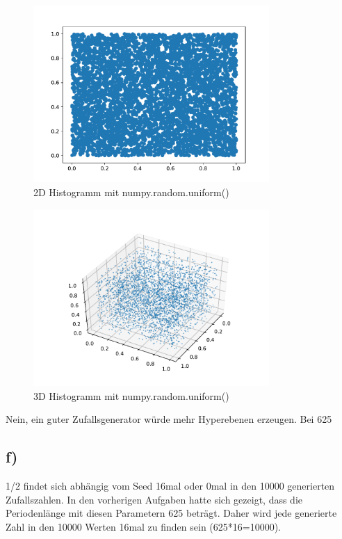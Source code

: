 \begin{figure}[H]
  \centering
  \includegraphics[width=0.8\textwidth]{nr8_d_npuni_2D_seed=0.2.pdf}
  \caption{2D Histogramm mit numpy.random.uniform()}
\end{figure}

\begin{figure}[H]
  \centering
  \includegraphics[width=0.8\textwidth]{nr8_d_npuni_3D_seed=0.2.pdf}
  \caption{3D Histogramm mit numpy.random.uniform()}
\end{figure}


Nein, ein guter Zufallsgenerator würde mehr Hyperebenen erzeugen.
Bei 625 
\subsection{f)}

1/2 findet sich abhängig vom Seed 16mal oder 0mal
in den 10000 generierten Zufallszahlen.
In den vorherigen Aufgaben hatte sich gezeigt, dass 
die Periodenlänge mit diesen Parametern 625 beträgt.
Daher wird jede generierte Zahl in den 10000
Werten 16mal zu finden sein (625*16=10000).


